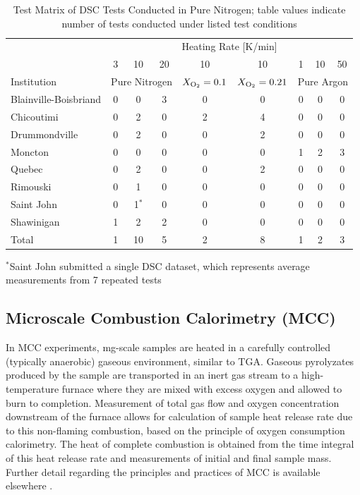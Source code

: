 \documentclass{book}
\begin{document}
\begin{table}[ht]
\caption{Test Matrix of DSC Tests Conducted in Pure Nitrogen; table values indicate number of tests conducted under listed test conditions}
\label{Table:Matrix_DSC}
\begin{center}
\begin{tabular}{lcccccccc}
							\hline
                      & \multicolumn{8}{c}{Heating Rate [K/min]} \\ 
                      & 3 & 10 & 20 & 10 & 10 & 1  & 10 & 50 \\ 
                      \hline
Institution           & \multicolumn{3}{c}{Pure Nitrogen} & $X_{\rm O_2}=0.1$ & $X_{\rm O_2}=0.21$ & \multicolumn{3}{c}{Pure Argon}  \\ \hline
Blainville-Boisbriand & 0 & 0     &     3 & 0 & 0 & 0 & 0 & 0 \\
Chicoutimi            & 0 & 2     &     0 & 2 & 4 & 0 & 0 & 0 \\
Drummondville         & 0 & 2     &     0 & 0 & 2 & 0 & 0 & 0 \\
Moncton               & 0 & 0     &     0 & 0 & 0 & 1 & 2 & 3 \\
Quebec                & 0 & 2     &     0 & 0 & 2 & 0 & 0 & 0 \\
Rimouski              & 0 & 1     &     0 & 0 & 0 & 0 & 0 & 0 \\
Saint John            & 0 & 1$^*$ &     0 & 0 & 0 & 0 & 0 & 0 \\
Shawinigan            & 1 & 2     &     2 & 0 & 0 & 0 & 0 & 0 \\ \hline
Total                 & 1 & 10    &     5 & 2 & 8 & 1 & 2 & 3 \\ \hline
\end{tabular}
\end{center}
$^*$Saint John submitted a single DSC dataset, which represents average measurements from 7 repeated tests
\end{table}

\subsection{Microscale Combustion Calorimetry (MCC)}

In MCC experiments, mg-scale samples are heated in a carefully controlled (typically anaerobic) gaseous environment, similar to TGA. Gaseous pyrolyzates produced by the sample are transported in an inert gas stream to a high-temperature furnace where they are mixed with excess oxygen and allowed to burn to completion. Measurement of total gas flow and oxygen concentration downstream of the furnace allows for calculation of sample heat release rate due to this non-flaming combustion, based on the principle of oxygen consumption calorimetry. The heat of complete combustion is obtained from the time integral of this heat release rate and measurements of initial and final sample mass. Further detail regarding the principles and practices of MCC is available elsewhere \cite{lyon2013principles}.
\end{document}
